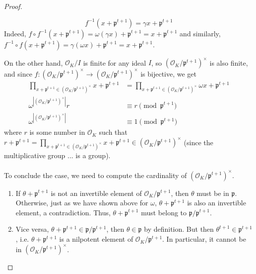 \documentclass{treatise}
\begin{document}
\begin{proof}
\begin{enumerate}
	$$f^{-1} (x + \mathfrak{p}^{t + 1}) = \gamma x + \mathfrak{p}^{t + 1}$$
	Indeed, $f \circ f^{-1} (x + \mathfrak{p}^{t + 1}) = \omega (\gamma x) + \mathfrak{p}^{t + 1} = x + \mathfrak{p}^{t + 1}$ and similarly, $f^{-1} \circ f  (x + \mathfrak{p}^{t + 1}) = \gamma (\omega x) + \mathfrak{p}^{t + 1} = x + \mathfrak{p}^{t + 1}$.
\end{enumerate}
On the other hand, $\mathcal{O}_K / I$ is finite for any ideal $I$, so $(\mathcal{O}_K / \mathfrak{p}^{t + 1})^\times$ is also finite, and since $f: (\mathcal{O}_K / \mathfrak{p}^{t + 1})^\times \to (\mathcal{O}_K / \mathfrak{p}^{t + 1})^\times$ is bijective, we get
\begin{align*}
\prod_{x + \mathfrak{p}^{t + 1} \in (\mathcal{O}_K / \mathfrak{p}^{t + 1})^\times} x + \mathfrak{p}^{t + 1} & = \prod_{x + \mathfrak{p}^{t + 1} \in (\mathcal{O}_K / \mathfrak{p}^{t + 1})^\times} \omega x + \mathfrak{p}^{t + 1} \\
\omega^{|(\mathcal{O}_K / \mathfrak{p}^{t + 1})^\times|} r & \equiv r \pmod{\mathfrak{p}^{t + 1}} \\
\omega^{|(\mathcal{O}_K / \mathfrak{p}^{t + 1})^\times|} & \equiv 1 \pmod{\mathfrak{p}^{t + 1}}
\end{align*}
where $r$ is some number in $\mathcal{O}_K$ such that $r + \mathfrak{p}^{t + 1} = \prod_{x + \mathfrak{p}^{t + 1} \in (\mathcal{O}_K / \mathfrak{p}^{t + 1})^\times} x + \mathfrak{p}^{t + 1} \in (\mathcal{O}_K / \mathfrak{p}^{t + 1})^\times$ (since the multiplicative group ... is a group).
\\
\\
To conclude the case, we need to compute the cardinality of $(\mathcal{O}_K / \mathfrak{p}^{t + 1})^\times$.
\begin{enumerate}
	\item If $\theta + \mathfrak{p}^{t + 1}$ is not an invertible element of $\mathcal{O}_K / \mathfrak{p}^{t + 1}$, then $\theta$ must be in $\mathfrak{p}$. Otherwise, just as we have shown above for $\omega$, $\theta + \mathfrak{p}^{t + 1}$ is also an invertible element, a contradiction. Thus, $\theta + \mathfrak{p}^{t + 1}$ must belong to $\mathfrak{p} / \mathfrak{p}^{t + 1}$.
	\item Vice versa, $\theta + \mathfrak{p}^{t + 1} \in \mathfrak{p} / \mathfrak{p}^{t + 1}$, then $\theta \in \mathfrak{p}$ by definition. But then $\theta^{t + 1} \in \mathfrak{p}^{t + 1}$, i.e. $\theta + \mathfrak{p}^{t + 1}$ is a nilpotent element of $\mathcal{O}_K / \mathfrak{p}^{t + 1}$. In particular, it cannot be in $(\mathcal{O}_K / \mathfrak{p}^{t + 1})^\times$.

\end{enumerate}
\end{proof}
\end{document}
